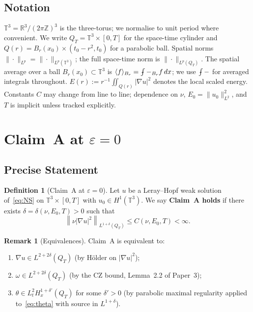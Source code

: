 \documentclass[11pt]{article}
\theoremstyle{definition}
\newtheorem{definition}[theorem]{Definition}
\newtheorem{remark}[theorem]{Remark}
\theoremstyle{remark}
\newcommand{\R}{\mathbb{R}}
\newcommand{\Z}{\mathbb{Z}}
\newcommand{\T}{\mathbb{T}}
\newcommand{\norm}[1]{\left\|#1\right\|}
\newcommand{\Hs}[1]{H^{#1}}
\newcommand{\grad}{\nabla}
\newcommand{\Xint}{\mathop{\,\rlap{-}\!\!\int}\nolimits}
\newcommand{\dlt}{\delta}
\newcommand{\eps}{\varepsilon}
\begin{document}
\subsection{Notation}
\label{sec:intro-notation}

$\T^3 = \R^3/(2\pi\Z)^3$ is the three-torus; we normalise to unit period
where convenient.  We write $Q_T = \T^3\times[0,T]$ for the space-time
cylinder and $Q(r) = B_r(x_0)\times(t_0-r^2,t_0)$ for a parabolic ball.
Spatial norms $\|\cdot\|_{L^p} = \|\cdot\|_{L^p(\T^3)}$; the full space-time
norm is $\|\cdot\|_{L^p(Q_T)}$.  The spatial average over a ball
$B_r(x_0)\subset\T^3$ is $\langle f\rangle_{B_r} = \Xint-_{B_r} f\,dx$;
we use $\Xint-$ for averaged integrals throughout.
$E(r) := r^{-1}\iint_{Q(r)}|\grad u|^2$ denotes the local scaled energy.
Constants $C$ may change from line to line; dependence on $\nu$,
$E_0 = \|u_0\|_{L^2}^2$, and $T$ is implicit unless tracked explicitly.

\section{Claim~A at $\eps=0$}
\label{sec:claimA-eps0}

\subsection{Precise Statement}

\begin{definition}[Claim~A at $\eps=0$]\label{def:claimA-eps0}
  Let $u$ be a Leray--Hopf weak solution of~\eqref{eq:NS} on $\T^3\times[0,T]$
  with $u_0\in\Hs{1}(\T^3)$.  We say \textbf{Claim~A holds} if there exists
  $\dlt=\dlt(\nu,E_0,T)>0$ such that
  \begin{equation}\label{eq:claimA}
    \norm{\nu|\grad u|^2}_{L^{1+\dlt}(Q_T)} \leq C(\nu,E_0,T) < \infty.
  \end{equation}
\end{definition}

\begin{remark}[Equivalences]
  Claim~A is equivalent to:
  \begin{enumerate}[label=(\roman*)]
  \item $\grad u\in L^{2+2\dlt}(Q_T)$ (by H\"older on $|\grad u|^2$);
  \item $\omega\in L^{2+2\dlt}(Q_T)$ (by the CZ bound, Lemma~2.2 of Paper~3);
  \item $\theta\in L^2_t\Hs{1+\dlt'}_x(Q_T)$ for some $\dlt'>0$ (by parabolic
    maximal regularity applied to~\eqref{eq:theta} with source in $L^{1+\dlt}$).
  \end{enumerate}
\end{remark}
\end{document}
